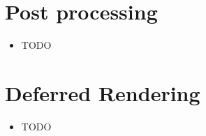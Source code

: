 \documentclass[a4paper]{article}
\begin{document}
\section{Post processing}

\begin{itemize}
  \item
    TODO

\end{itemize}

\section{Deferred Rendering}

\begin{itemize}
  \item
    TODO

\end{itemize}
\end{document}
